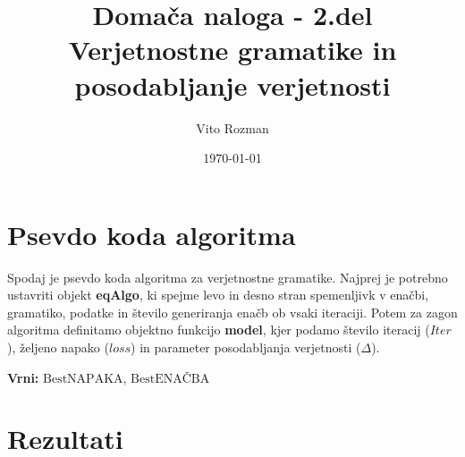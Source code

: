 \documentclass[12pt]{article}
\title{Domača naloga - 2.del \\
\large Verjetnostne gramatike in posodabljanje verjetnosti}
\begin{document}
    
\author{Vito Rozman}
\date{\today}
\maketitle

\section{Psevdo koda algoritma}

Spodaj je psevdo koda algoritma za verjetnostne gramatike. Najprej je potrebno ustavriti 
objekt \textbf{eqAlgo}, ki spejme levo in desno stran spemenljivk v enačbi, gramatiko, 
podatke in število generiranja enačb ob vsaki iteraciji. Potem za zagon 
algoritma definitamo objektno funkcijo \textbf{model},
kjer podamo število iteracij ($Iter$), željeno napako ($loss$) in 
parameter posodabljanja verjetnosti ($\Delta$).\\


\begin{algorithm}[H]
    
    \textbf{Vrni:} $\text{BestNAPAKA}$, $\text{BestENAČBA}$\\
\end{algorithm}

\section{Rezultati}
\end{document}
